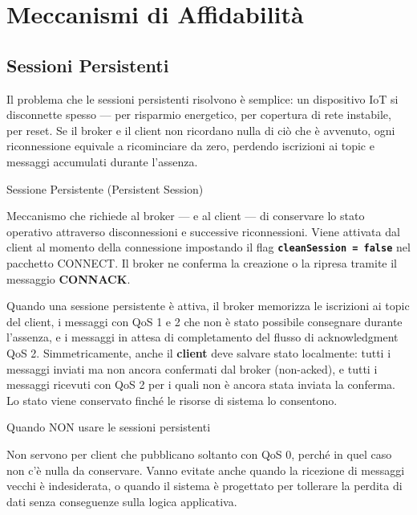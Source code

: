 \documentclass[
  italian,
  openany]{book}
\begin{document}
\section{Meccanismi di
Affidabilità}\label{meccanismi-di-affidabilituxe0}

\subsection{Sessioni Persistenti}\label{sessioni-persistenti}

Il problema che le sessioni persistenti risolvono è semplice: un
dispositivo IoT si disconnette spesso --- per risparmio energetico, per
copertura di rete instabile, per reset. Se il broker e il client non
ricordano nulla di ciò che è avvenuto, ogni riconnessione equivale a
ricominciare da zero, perdendo iscrizioni ai topic e messaggi accumulati
durante l'assenza.

\begin{calloutdefinition}{Sessione Persistente (Persistent Session)}

Meccanismo che richiede al broker --- e al client --- di conservare lo
stato operativo attraverso disconnessioni e successive riconnessioni.
Viene attivata dal client al momento della connessione impostando il
flag \textbf{\texttt{cleanSession\ =\ false}} nel pacchetto CONNECT. Il
broker ne conferma la creazione o la ripresa tramite il messaggio
\textbf{CONNACK}.

\end{calloutdefinition}

Quando una sessione persistente è attiva, il broker memorizza le
iscrizioni ai topic del client, i messaggi con QoS 1 e 2 che non è stato
possibile consegnare durante l'assenza, e i messaggi in attesa di
completamento del flusso di acknowledgment QoS 2. Simmetricamente, anche
il \textbf{client} deve salvare stato localmente: tutti i messaggi
inviati ma non ancora confermati dal broker (non-acked), e tutti i
messaggi ricevuti con QoS 2 per i quali non è ancora stata inviata la
conferma. Lo stato viene conservato finché le risorse di sistema lo
consentono.

\begin{calloutwarning}{Quando NON usare le sessioni persistenti}

Non servono per client che pubblicano soltanto con QoS 0, perché in quel
caso non c'è nulla da conservare. Vanno evitate anche quando la
ricezione di messaggi vecchi è indesiderata, o quando il sistema è
progettato per tollerare la perdita di dati senza conseguenze sulla
logica applicativa.

\end{calloutwarning}
\end{document}
